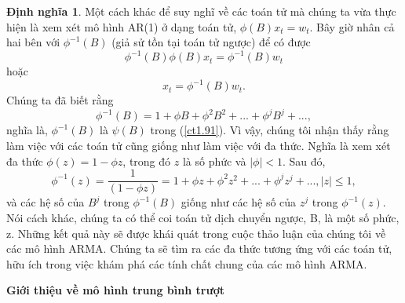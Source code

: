 \documentclass[12pt, a4paper,oneside]{book}
\theoremstyle{definition}
\newtheorem{dn}[theo]{Định nghĩa}
\begin{document}
\begin{dn}
Một cách khác để suy nghĩ về các toán tử mà chúng ta vừa thực hiện là xem xét mô hình AR(1) ở dạng toán tử, $\phi(B)x_{t} = w_{t}$. Bây giờ nhân cả hai bên với $\phi^{-1}(B)$ (giả sử tồn tại toán tử ngược) để có được 
\begin{equation}
\phi^{-1}(B)\phi(B)x_{t}= \phi^{-1}(B)w_{t} \label{ct1.96}
\end{equation}
hoặc
\begin{equation}
x_{t}= \phi^{-1}(B)w_{t}. \label{ct1.97}
\end{equation}
Chúng ta đã biết rằng
\begin{equation}
\phi^{-1}(B)= 1 +\phi B+ \phi^{2}B^{2}+ ...+ \phi^{j}B^{j}+..., \label{ct1.98}
\end{equation}
nghĩa là, $\phi^{-1}(B)$ là $\psi(B)$ trong (\ref{ct1.91}). Vì vậy, chúng tôi nhận thấy rằng làm việc với các toán tử cũng giống như làm việc với đa thức. Nghĩa là xem xét đa thức $\phi(z) = 1-\phi z$, trong đó $z$ là số phức và $|\phi|<1$. Sau đó,
\begin{equation}
\phi^{-1}(z)= \dfrac{1}{(1-\phi z)}= 1+ \phi z+ \phi^{2} z^{2}+...+ \phi^{j} z^{j}+..., |z|\leq1, \label{ct1.99}
\end{equation}	
và các hệ số của $B^{j}$ trong $\phi^{-1}(B)$ giống như các hệ số của $z^{j}$ trong $\phi^{-1}(z)$. Nói cách khác, chúng ta có thể coi toán tử dịch chuyển ngược, B, là một số phức, z. Những kết quả này sẽ được khái quát trong cuộc thảo luận của chúng tôi về các mô hình ARMA. Chúng ta sẽ tìm ra các đa thức tương ứng với các toán tử, hữu ích trong việc khám phá các tính chất chung của các mô hình ARMA.
\end{dn}

\textbf{Giới thiệu về mô hình trung bình trượt}
\end{document}
